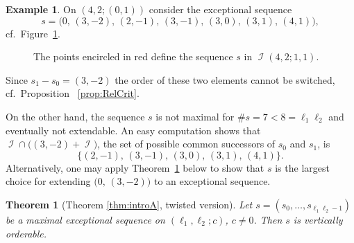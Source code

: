 \documentclass[11pt]{article}
\newtheorem{theorem}[theo]{Theorem}
\theoremstyle{definition}
\newtheorem{exam}[theo]{Example}
\numberwithin{equation}{section}
\newcommand{\CI}{{\mathcal I}}
\newcommand{\ko}{\overline}
\newcommand{\cb}{{\ko{c}}}
\newcommand{\nImm}{\operatorname{\CI}}
\newcommand{\xa}{\alpha}
\newcommand{\xb}{\beta}
\newcommand{\cl}{s}
\newcommand{\mes}{maximal exceptional sequence}
\renewcommand{\sharp}{\#}
\newcommand{\thLex}{\ref{thm:introA}}
\newcommand{\immreg}[4]{
\def\la{#1} 
\def\lb{#2} 
\def\ch{#3} 
\def\cb{#4} 
\draw[color=oliwkowy!40] (-\cb-0.3,-\la/\ch) grid (\la+0.3,\lb+\la/\ch);
\fill[pattern color=parallelogram, pattern=north west lines]
  (0,0) -- (\la,-\la/\ch) -- (\la,0) -- cycle
  (\la-\cb,\lb) -- (-\cb,\lb+\la/\ch) -- (-\cb,\lb) -- cycle;
\draw[thick, color=black]
  (0,0) -- (\la,-\la/\ch) -- (\la,0)
  (\la-\cb,\lb) -- (-\cb,\lb+\la/\ch) -- (-\cb,\lb);
\fill[pattern color=parallelogram, pattern=north west lines]
  (0,0) -- (-\cb,\cb/\ch) -- (-\cb,\lb) --
  (\la-\cb,\lb) -- (\la,\lb-\cb/\ch) -- (\la,0) -- cycle;
\fill[thick, color=origin]
  (0,0) circle (5pt);
\draw[thick, color=origin]
  (\la-\cb,\lb) circle (5pt)
  (-0.5,-0.5) node{$0$};
\foreach \xa in {-1,...,1}
\foreach \xb in {-\cb,...,\la}
\foreach \y in {2,...,\lb} {
  \fill[thick, color=regi]
    (\xa-\cb,\y-1) circle (5pt)
    (\xb+1,\y-1) circle (5pt); }
\pgfmathsetmacro{\hMax}{(\la-2)/\ch}
\foreach \y in {0,...,\hMax} {
  \pgfmathsetmacro{\wMax}{\la-\ch*\y-1}
  \foreach \x in {1,...,\wMax} {
    \fill[thick, color=regii]
      (\la-\x,-\y) circle (5pt)
      (\x-\cb,\y+\lb) circle (5pt); }}
\foreach \x in {2,...,\la} {
  \fill[thick, color=regii]
  (\x-1,0) circle (5pt)
  (\la-\cb-\x+1,\lb) circle (5pt); }
}
\begin{document}
\begin{exam}
\label{exam:NexNmax}
On $(4,2;(0,1))$ consider the exceptional 
sequence
$$
\cl=\big(0,\,(3,-2),\,(2,-1),\,(3,-1),
\,(3,0),\,(3,1),\,(4,1)\big),
$$
cf.\ Figure~\ref{fig:SharpEstimate}.
\begin{figure}[ht]
\caption{The points encircled in 
red define the sequence $\cl$ in 
$\nImm(4,2;1,1)$.}
\label{fig:SharpEstimate}
\end{figure}
Since $\cl_1-\cl_0=(3,-2)$ the 
order of these two elements cannot 
be switched, cf.\ Proposition
~\ref{prop:RelCrit}. 

On the other hand, the sequence 
$\cl$ is not maximal for 
$\sharp\cl=7<8=\ell_1\ell_2$ and eventually 
not extendable. An easy computation 
shows that $\nImm\cap\big((3,-2)+\nImm\big)$,
the set of possible common successors of 
$\cl_0$ and $\cl_1$, is
$$
\{(2,-1),\,(3,-1),\,(3,0),\,(3,1),\,(4,1)\}.
$$
Alternatively, one may apply
Theorem~\ref{thm:MESRel} below
to show that $\cl$ is the largest 
choice for extending $\big(0,\,(3,-2)\big)$ 
to an exceptional sequence.
\end{exam}

\begin{theorem}[Theorem {\thLex}, twisted version]
\label{thm:MESRel}
Let $\cl=(\cl_0,\ldots,\cl_{\ell_1\ell_2-1})$ be 
a {\mes} on $(\ell_1,\ell_2;c)$, $c\not=0$. 
Then $\cl$ is vertically orderable.
\end{theorem}
\end{document}
